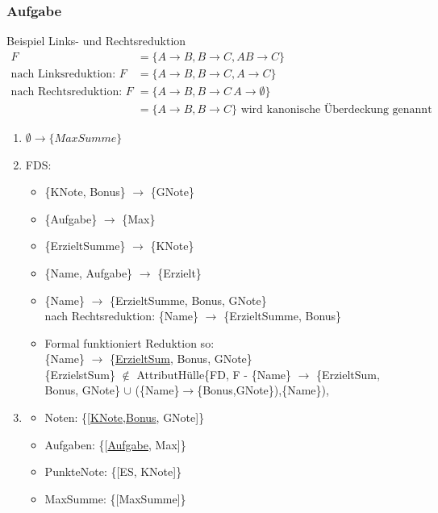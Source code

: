 \subsubsection{Aufgabe}
Beispiel Links- und Rechtsreduktion
\begin{align*}
F &= \{A \to B, B\to C, AB \to C\}\\
\text{nach Linksreduktion: }F &= \{A \to B, B\to C, A \to C\}\\
\text{nach Rechtsreduktion: }F &= \{A \to B, B \to C\, A \to \emptyset\}\\
&= \{A \to B, B \to C\} \text{ wird kanonische Überdeckung genannt}
\end{align*} 
\begin{enumerate}
	\item $\emptyset \to \{MaxSumme\}$
	\item FDS:
\begin{itemize}
	\item \{KNote, Bonus\} $\to$ \{GNote\}
	\item \{Aufgabe\} $\to$ \{Max\}
	\item \{ErzieltSumme\} $\to$ \{KNote\}
	\item \{Name, Aufgabe\} $\to$ \{Erzielt\}
	\item \{Name\} $\to$ \{ErzieltSumme, Bonus, GNote\} \\
		nach Rechtsreduktion: \{Name\} $\to$ \{ErzieltSumme, Bonus\}
	\item Formal funktioniert Reduktion so:\\
	\{Name\} $\to$ \{\underline{ErzieltSum}, Bonus, GNote\}\\
	\{ErzielstSum\} $\notin$ AttributHülle\{FD, F - \{Name\} $\to$ \{ErzieltSum, Bonus, GNote\} $\cup$ (\{Name\}$\to$\{Bonus,GNote\}),\{Name\}),
	\end{itemize}
	\item
	\begin{itemize}
		\item Noten: \{[\underline{KNote},\underline{Bonus}, GNote]\}
		\item Aufgaben: \{[\underline{Aufgabe}, Max]\}
		\item PunkteNote: \{[ES, KNote]\}
		\item MaxSumme: \{[MaxSumme]\}
	\end{itemize}
\end{enumerate}
